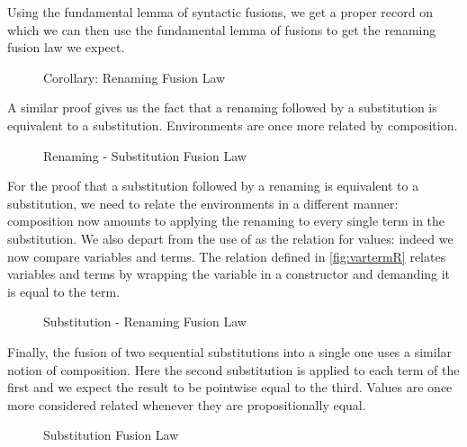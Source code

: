Using the fundamental lemma of syntactic fusions, we get a proper  record
on which we can then use the fundamental lemma of fusions to get the renaming fusion
law we expect.

\begin{figure}[h]
\caption{Corollary: Renaming Fusion Law\label{fig:renren}}
\end{figure}

A similar proof gives us the fact that a renaming followed by a substitution is equivalent
to a substitution. Environments are once more related by composition.

\begin{figure}[h]
\caption{Renaming - Substitution Fusion Law\label{fig:rensub}}
\end{figure}

For the proof that a substitution followed by a renaming is equivalent to a
substitution, we need to relate the environments in a different manner:
composition now amounts to applying the renaming to every single term in the
substitution. We also depart from the use of  as the relation for values:
indeed we now compare variables and terms. The relation  defined in
\cref{fig:vartermR} relates variables and terms by wrapping the variable in a
 constructor and demanding it is equal to the term.

\begin{figure}[h]
\caption{Substitution - Renaming Fusion Law\label{fig:subren}}
\end{figure}

Finally, the fusion of two sequential substitutions into a single one uses a
similar notion of composition. Here the second substitution is applied to each
term of the first and we expect the result to be pointwise equal to the third.
Values are once more considered related whenever they are propositionally equal.

\begin{figure}[h]
\caption{Substitution Fusion Law\label{fig:subsub}}
\end{figure}

